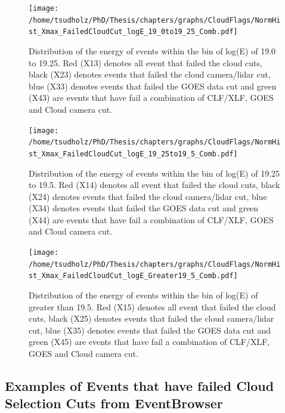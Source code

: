\begin{figure}
\centering
\texttt{[image: /home/tsudholz/PhD/Thesis/chapters/graphs/CloudFlags/NormHist\_Xmax\_FailedCloudCut\_logE\_19\_0to19\_25\_Comb.pdf]}
\caption{Distribution of the energy of events within the bin of log(E) of 19.0 to 19.25. Red (X13) denotes all event that failed the cloud cuts, black (X23) denotes events that failed the cloud camera/lidar cut, blue (X33) denotes events that failed the GOES data cut and green (X43) are events that have fail a combination of CLF/XLF, GOES and Cloud camera cut.}
\end{figure}

\begin{figure}
\centering
\texttt{[image: /home/tsudholz/PhD/Thesis/chapters/graphs/CloudFlags/NormHist\_Xmax\_FailedCloudCut\_logE\_19\_25to19\_5\_Comb.pdf]}
\caption{Distribution of the energy of events within the bin of log(E) of 19.25 to 19.5. Red (X14) denotes all event that failed the cloud cuts, black (X24) denotes events that failed the cloud camera/lidar cut, blue (X34) denotes events that failed the GOES data cut and green (X44) are events that have fail a combination of CLF/XLF, GOES and Cloud camera cut.}
\end{figure}

\begin{figure}
\centering
\texttt{[image: /home/tsudholz/PhD/Thesis/chapters/graphs/CloudFlags/NormHist\_Xmax\_FailedCloudCut\_logE\_Greater19\_5\_Comb.pdf]}
\caption{Distribution of the energy of events within the bin of log(E) of greater than 19.5. Red (X15) denotes all event that failed the cloud cuts, black (X25) denotes events that failed the cloud camera/lidar cut, blue (X35) denotes events that failed the GOES data cut and green (X45) are events that have fail a combination of CLF/XLF, GOES and Cloud camera cut.}
\end{figure}

\subsection{Examples of Events that have failed Cloud Selection Cuts from EventBrowser}


